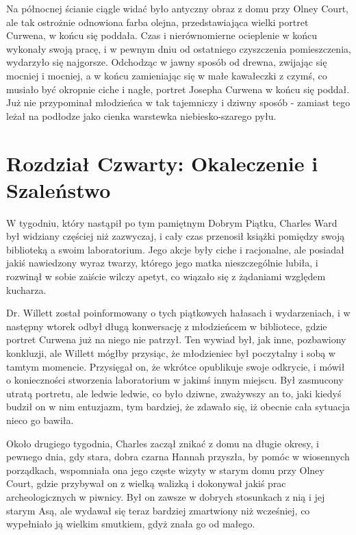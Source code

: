 Na północnej ścianie ciągle widać było antyczny obraz z domu przy Olney Court, ale tak ostrożnie odnowiona farba olejna, przedstawiająca wielki portret Curwena, w końcu się poddała. Czas i nierównomierne ocieplenie w końcu wykonały swoją pracę, i w pewnym dniu od ostatniego czyszczenia pomieszczenia, wydarzyło się najgorsze. Odchodząc w jawny sposób od drewna, zwijając się mocniej i mocniej, a w końcu zamieniając się w małe kawałeczki z czymś, co musiało być okropnie ciche i nagłe, portret Josepha Curwena w końcu się poddał. Już nie przypominał młodzieńca w tak tajemniczy i dziwny sposób - zamiast tego leżał na podłodze jako cienka warstewka niebiesko-szarego pyłu. 

\section{Rozdział Czwarty: Okaleczenie i Szaleństwo}

W tygodniu, który nastąpił po tym pamiętnym Dobrym Piątku, Charles Ward był widziany częściej niż zazwyczaj, i cały czas przenosił książki pomiędzy swoją biblioteką a swoim laboratorium. Jego akcje były ciche i racjonalne, ale posiadał jakiś nawiedzony wyraz twarzy, którego jego matka nieszczególnie lubiła, i rozwinął w sobie zaiście wilczy apetyt, co wiązało się z żądaniami względem kucharza.

Dr. Willett został poinformowany o tych piątkowych hałasach i wydarzeniach, i w następny wtorek odbył długą konwersację z młodzieńcem w bibliotece, gdzie portret Curwena już na niego nie patrzył. Ten wywiad był, jak inne, pozbawiony konkluzji, ale Willett mógłby przysiąc, że młodzieniec był poczytalny i sobą w tamtym momencie. Przysięgał on, że wkrótce opublikuje swoje odkrycie, i mówił o konieczności stworzenia laboratorium w jakimś innym miejscu. Był zasmucony utratą portretu, ale ledwie ledwie, co było dziwne, zważywszy an to, jaki kiedyś budził on w nim entuzjazm, tym bardziej, że zdawało się, iż obecnie cała sytuacja nieco go bawiła. 

Około drugiego tygodnia, Charles zaczął znikać z domu na długie okresy, i pewnego dnia, gdy stara, dobra czarna Hannah przyszła, by pomóc w wiosennych porządkach, wspomniała ona jego częste wizyty w starym domu przy Olney Court, gdzie przybywał on z wielką walizką i dokonywał jakiś prac archeologicznych w piwnicy. Był on zawsze w dobrych stosunkach z nią i jej starym Asą, ale wydawał się teraz bardziej zmartwiony niż wcześniej, co wypełniało ją wielkim smutkiem, gdyż znała go od małego. 

